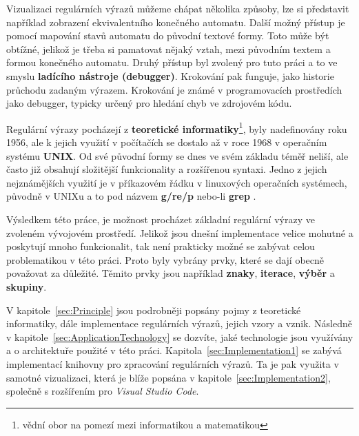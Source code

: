 Vizualizaci regulárních výrazů můžeme chápat několika způsoby, 
lze si představit například zobrazení ekvivalentního konečného automatu.
Další možný přístup je pomocí mapování stavů automatu do původní textové formy. 
Toto může být obtížné, jelikož je třeba si pamatovat nějaký vztah, 
mezi původním textem a formou konečného automatu. 
Druhý přístup byl zvolený pro tuto
práci a to ve smyslu \textbf{ladícího nástroje (debugger)}. Krokování pak funguje, jako historie průchodu zadaným výrazem. 
Krokování je známé v programovacích prostředích jako debugger,
typicky určený pro hledání chyb ve zdrojovém kódu.

Regulární výrazy pocházejí z \textbf{teoretické informatiky}\footnote{vědní obor na pomezí mezi informatikou a matematikou}, 
byly nadefinovány roku 1956, ale k jejich využití v počítačích se dostalo až v roce 1968 v operačním systému \textbf{UNIX}.
Od své původní formy se dnes ve svém základu téměř neliší, ale často již obsahují složitější funkcionality a rozšířenou syntaxi.
Jedno z jejich nejznámějších využití je v příkazovém řádku v linuxových operačních systémech, původně v UNIXu a to pod názvem \textbf{g/re/p} nebo-li \textbf{grep} 
\cite{Wikipedia_2024}. 

Výsledkem této práce, je možnost procházet základní regulární výrazy ve zvoleném vývojovém prostředí. 
Jelikož jsou dnešní implementace velice mohutné a poskytují mnoho funkcionalit, tak není prakticky možné
se zabývat celou problematikou v této práci. 
Proto byly vybrány prvky, které se dají obecně považovat za důležité. 
Těmito prvky jsou například \textbf{znaky}, \textbf{iterace}, \textbf{výběr} a \textbf{skupiny}.

V kapitole~\ref{sec:Principle} jsou podrobněji popsány pojmy z teoretické informatiky, dále implementace regulárních výrazů, jejich vzory a vznik.
Následně v kapitole~\ref{sec:ApplicationTechnology} se dozvíte, jaké technologie jsou využívány a o architektuře použité v této práci.
Kapitola~\ref{sec:Implementation1} se zabývá implementací knihovny pro zpracování regulárních výrazů. 
Ta je pak využita v samotné vizualizaci, která je blíže popsána v kapitole~\ref{sec:Implementation2}, společně s rozšířením pro \textit{Visual Studio Code}.

\endinput